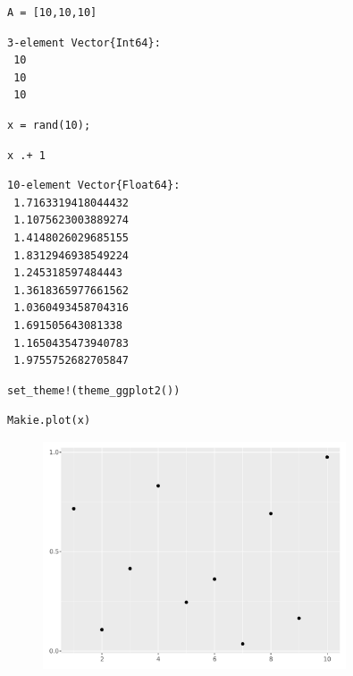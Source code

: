 \begin{lstlisting}[language=JuliaLocal, style=julia]
A = [10,10,10]
\end{lstlisting}

\begin{verbatim}
3-element Vector{Int64}:
 10
 10
 10
\end{verbatim}

\begin{lstlisting}[language=JuliaLocal, style=julia]
x = rand(10);
\end{lstlisting}

\begin{lstlisting}[language=JuliaLocal, style=julia]
x .+ 1
\end{lstlisting}

\begin{verbatim}
10-element Vector{Float64}:
 1.7163319418044432
 1.1075623003889274
 1.4148026029685155
 1.8312946938549224
 1.245318597484443
 1.3618365977661562
 1.0360493458704316
 1.691505643081338
 1.1650435473940783
 1.9755752682705847
\end{verbatim}

\begin{lstlisting}[language=JuliaLocal, style=julia]
set_theme!(theme_ggplot2())
\end{lstlisting}

\begin{lstlisting}[language=JuliaLocal, style=julia]
Makie.plot(x)
\end{lstlisting}

\begin{figure}[H]
	\centering
	\includegraphics[width=0.8\textwidth]{./figures/notebooktest_figure2.pdf}
	\label{fig:notebooktest_figure2.pdf}

\end{figure}

